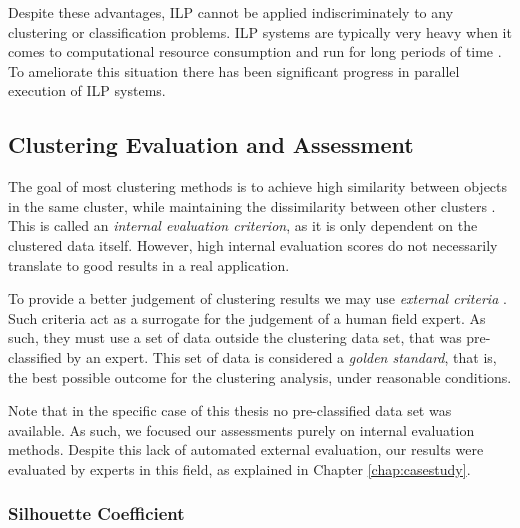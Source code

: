 Despite these advantages, ILP cannot be applied indiscriminately to any
clustering or classification problems. ILP systems are typically very heavy when
it comes to computational resource consumption and run for long periods of time
\cite{fonseca2003implementation}. To ameliorate this situation there has been
significant progress in parallel execution of ILP systems.

\subsection{Clustering Evaluation and Assessment}\label{sec:clustereval}

The goal of most clustering methods is to achieve high similarity between
objects in the same cluster, while maintaining the dissimilarity between other
clusters \cite{Manning:2008:IIR:1394399}. This is called an \emph{internal
evaluation criterion}, as it is only dependent on the clustered data itself.
However, high internal evaluation scores do not necessarily translate to good
results in a real application.

To provide a better judgement of clustering results we may use \emph{external
criteria} \cite{Manning:2008:IIR:1394399}. Such criteria act as a surrogate for
the judgement of a human field expert. As such, they must use a set of data
outside the clustering data set, that was pre-classified by an expert. This set
of data is considered a \emph{golden standard}, that is, the best possible outcome for
the clustering analysis, under reasonable conditions.

Note that in the specific case of this thesis no pre-classified data set was
available. As such, we focused our assessments purely on internal evaluation
methods. Despite this lack of automated external evaluation, our results were
evaluated by experts in this field, as explained in Chapter \ref{chap:casestudy}.

\subsubsection*{Silhouette Coefficient}

